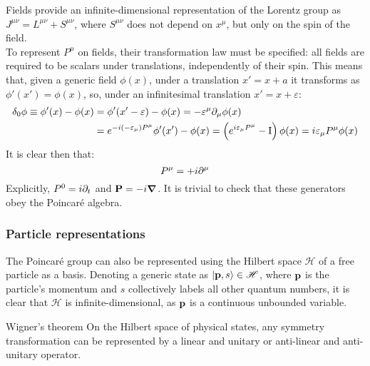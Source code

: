 Fields provide an infinite-dimensional representation of the Lorentz group as $ J^{\mu \nu} = L^{\mu \nu} + S^{\mu \nu} $, where $ S^{\mu \nu} $ does not depend on $ x^\mu $, but only on the spin of the field.\\
To represent $ P^\mu $ on fields, their transformation law must be specified: all fields are required to be scalars under translations, independently of their spin. This means that, given a generic field $ \phi(x) $, under a translation $ x' = x + a $ it transforms as $ \phi'(x') = \phi(x) $, so, under an infinitesimal translation $ x' = x + \varepsilon $:
\begin{equation*}
  \begin{split}
    \delta_0 \phi \equiv \phi'(x) - \phi(x) &= \phi'(x' - \varepsilon) - \phi(x) = - \varepsilon^\mu \partial_\mu \phi(x) \\
                                            &= e^{-i (-\varepsilon_\mu) P^\mu} \phi'(x') - \phi(x) = \left( e^{i \varepsilon_\mu P^\mu} - \mathrm{I} \right) \phi(x) = i \varepsilon_\mu P^\mu \phi(x)
  \end{split}
\end{equation*}
It is clear then that:
\begin{equation}
  P^\mu = +i \partial^\mu
  \label{eq:1.51}
\end{equation}
Explicitly, $ P^0 = i \partial_t $ and $ \mathbf{P} = - i \boldsymbol{\nabla} $. It is trivial to check that these generators obey the Poincaré algebra.

\subsubsection{Particle representations}

The Poincaré group can also be represented using the Hilbert space $ \mathscr{H} $ of a free particle as a basis. Denoting a generic state as $ \ket{\mathbf{p},s} \in \mathscr{H} $, where $ \mathbf{p} $ is the particle's momentum and $ s $ collectively labels all other quantum numbers, it is clear that $ \mathscr{H} $ is infinite-dimensional, as $ \mathbf{p} $ is a continuous unbounded variable.

\begin{theorem}{Wigner's theorem}{}
  On the Hilbert space of physical states, any symmetry transformation can be represented by a linear and unitary or anti-linear and anti-unitary operator.
\end{theorem}

